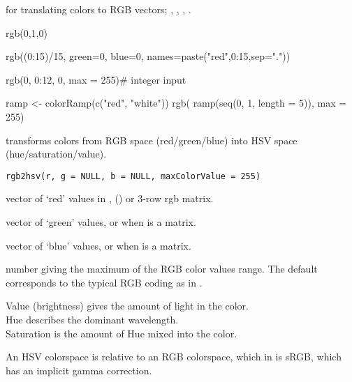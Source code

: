 %
\begin{SeeAlso}\relax
{} for translating \R{} colors to RGB vectors;
, , ,
.
\end{SeeAlso}
%
\begin{Examples}
\begin{ExampleCode}
rgb(0,1,0)

rgb((0:15)/15, green=0, blue=0, names=paste("red",0:15,sep="."))

rgb(0, 0:12, 0, max = 255)# integer input

ramp <- colorRamp(c("red", "white"))
rgb( ramp(seq(0, 1, length = 5)), max = 255)
\end{ExampleCode}
\end{Examples}
%
\begin{Description}\relax
{} transforms colors
from RGB space (red/green/blue)
into HSV space (hue/saturation/value).
\end{Description}
%
\begin{Usage}
\begin{verbatim}
rgb2hsv(r, g = NULL, b = NULL, maxColorValue = 255)
\end{verbatim}
\end{Usage}
%
\begin{Arguments}
\begin{ldescription}
\item[\code{r}] vector of `red' values in \eqn{[0, M]}{}, () or 3-row rgb matrix.
\item[\code{g}] vector of `green' values, or  when
 is a matrix.
\item[\code{b}] vector of `blue' values, or  when
 is a matrix.
\item[\code{maxColorValue}] number giving the maximum of the RGB color values
range.  The default  corresponds to the typical 
RGB coding as in .
\end{ldescription}
\end{Arguments}
%
\begin{Details}\relax
Value (brightness) gives the amount of light in the color.\\{}
Hue describes the dominant wavelength.\\{}
Saturation is the amount of Hue mixed into the color.

An HSV colorspace is relative to an RGB colorspace, which in \R{}
is sRGB, which has an implicit gamma correction.
\end{Details}
